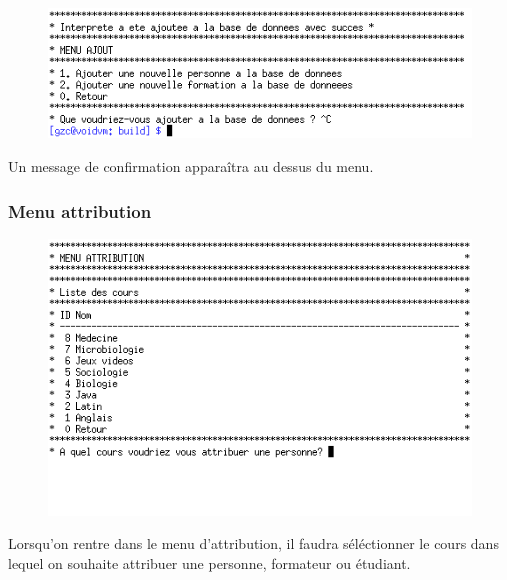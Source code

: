 \documentclass[11pt]{article}
\begin{document}
\begin{figure}[ht]
  \centering
  \includegraphics[trim=0 15 10 10, clip, scale=0.8]{images/12.png.png}
\end{figure}
Un message de confirmation apparaîtra au dessus du menu.

\newpage
\subsubsection{Menu attribution}
\begin{figure}[ht]
  \centering
  \includegraphics[trim=0 60 0 0, clip, scale=0.8]{images/13.png.png}
\end{figure}
Lorsqu'on rentre dans le menu d'attribution, il faudra séléctionner le cours dans lequel on souhaite attribuer une personne, formateur ou étudiant.
\end{document}
